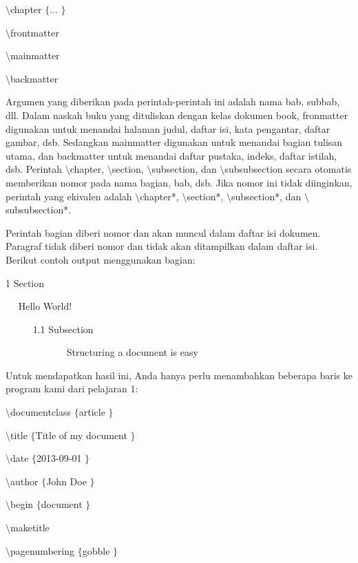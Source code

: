 {\fontsize{10pt}{10pt}\selectfont  $  \setminus  $chapter $  \{  $... $  \}  $}
 \par
\vspace{9pt}
{\fontsize{10pt}{10pt}\selectfont  $  \setminus  $frontmatter}
 \par
\vspace{9pt}
{\fontsize{10pt}{10pt}\selectfont  $  \setminus  $mainmatter}
 \par
\vspace{9pt}
{\fontsize{10pt}{10pt}\selectfont  $  \setminus  $backmatter}
 \par
\vspace{12pt}
\hspace{0.50in} Argumen yang diberikan pada perintah-perintah ini adalah nama bab, subbab, dll. Dalam naskah buku yang dituliskan dengan kelas dokumen book, fronmatter digunakan untuk menandai halaman judul, daftar isi, kata pengantar, daftar gambar, dsb. Sedangkan mainmatter digunakan untuk menandai bagian tulisan utama, dan backmatter untuk menandai daftar pustaka, indeks, daftar istilah, dsb. Perintah  $  \setminus  $chapter,  $  \setminus  $section,  $  \setminus  $subsection, dan  $  \setminus  $subsubsection secara otomatis memberikan nomor pada nama bagian, bab, dsb. Jika nomor ini tidak diinginkan, perintah yang ekivalen adalah  $  \setminus  $chapter*,  $  \setminus  $section*,  $  \setminus  $subsection*, dan  $  \setminus  $subsubsection*.
 \par
\vspace{12pt}
\hspace{0.50in} Perintah bagian diberi nomor dan akan muncul dalam daftar isi dokumen. Paragraf tidak diberi nomor dan tidak akan ditampilkan dalam daftar isi. Berikut contoh output menggunakan bagian:
 \par
1 Section
 \par
~~ Hello World!
 \par
~~~~~ 1.1 Subsection
 \par
~~~~~~~~~~~~ Structuring a document is easy
 \par
\vspace{12pt}
\hspace{0.50in} Untuk mendapatkan hasil ini, Anda hanya perlu menambahkan beberapa baris ke program kami dari pelajaran 1:
 \par
 $  \setminus  $documentclass $  \{  $article $  \}  $
 \par
\vspace{12pt}
 $  \setminus  $title $  \{  $Title of my document $  \}  $
 \par
 $  \setminus  $date $  \{  $2013-09-01 $  \}  $
 \par
 $  \setminus  $author $  \{  $John Doe $  \}  $
 \par
\vspace{12pt}
 $  \setminus  $begin $  \{  $document $  \}  $
 \par
\vspace{12pt}
 $  \setminus  $maketitle
 \par
 $  \setminus  $pagenumbering $  \{  $gobble $  \}  $
 \par

